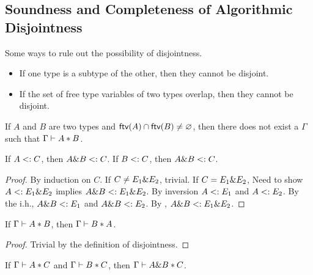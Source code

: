 \subsection{Soundness and Completeness of Algorithmic Disjointness}

Some ways to rule out the possibility of disjointness.

\begin{itemize}
  \item If one type is a subtype of the other, then they cannot be disjoint.
  \item If the set of free type variables of two types overlap, then they cannot
  be disjoint.
\end{itemize}

\begin{lemma}
  If $A$ and $B$ are two types and $\textsf{ftv}(A) \cap \textsf{ftv}(B) \neq \varnothing$, then
  there does not exist a $\Gamma$ such that $\Gamma \vdash A * B$.
\end{lemma}

\begin{theorem}
  If $A <: C$, then $A \& B <: C$.
  If $B <: C$, then $A \& B <: C$.
\end{theorem}


\begin{proof}
  By induction on $C$.
  If $C \neq E_1 \& E_2$, trivial.
  If $C = E_1 \& E_2$,
  Need to show $A <: E_1 \& E_2$ implies $A \& B <: E_1 \& E_2$.
  By inversion $A <: E_1$ and $A <: E_2$.
  By the i.h., $A \& B <: E_1$ and $A \& B <: E_2$.
  By , $A \& B <: E_1 \& E_2$.
\end{proof}

\begin{lemma}
  \label{lemma:symmetry-of-disjointness}

  If $\Gamma \vdash A * B$, then $\Gamma \vdash B * A$.
\end{lemma}

\begin{proof}
  Trivial by the definition of disjointness.
\end{proof}

\begin{theorem}
  \label{theorem:disjoint-intersect}

  If $\Gamma \vdash A * C$ and $\Gamma \vdash B * C$,
  then $\Gamma \vdash A \& B * C$.
\end{theorem}

